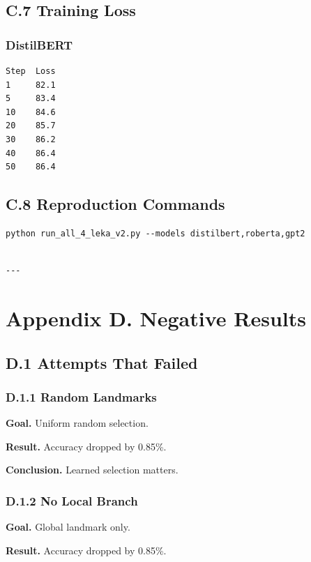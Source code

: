 \subsection{C.7 Training Loss}

\subsubsection{DistilBERT}
\begin{lstlisting}
Step  Loss
1     82.1
5     83.4
10    84.6
20    85.7
30    86.2
40    86.4
50    86.4
\end{lstlisting}

\subsection{C.8 Reproduction Commands}

\begin{lstlisting}
python run_all_4_leka_v2.py --models distilbert,roberta,gpt2
\end{lstlisting}
\begin{lstlisting}

---
\end{lstlisting}

\section{Appendix D. Negative Results}

\subsection{D.1 Attempts That Failed}

\subsubsection{D.1.1 Random Landmarks}

\textbf{Goal.} Uniform random selection.

\textbf{Result.} Accuracy dropped by 0.85\%.

\textbf{Conclusion.} Learned selection matters.

\subsubsection{D.1.2 No Local Branch}

\textbf{Goal.} Global landmark only.

\textbf{Result.} Accuracy dropped by 0.85\%.

